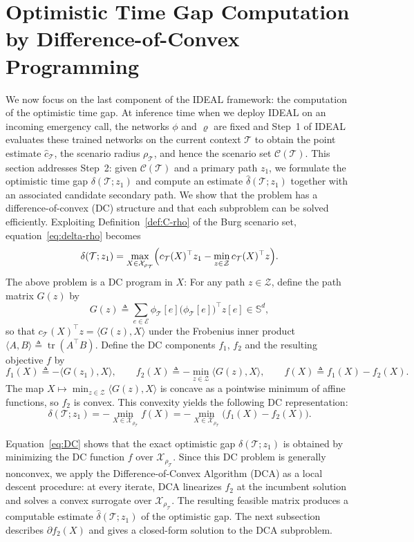 \documentclass[11pt, letterpaper, oneside, reqno]{amsart}
\DeclareMathOperator{\Tr}{tr}
\newcommand{\inner}[2]{\big \langle #1, #2 \big \rangle }
\newcommand{\Let}{\triangleq}
\begin{document}
\section{Optimistic Time Gap Computation by Difference-of-Convex Programming} \label{sec:solution-procedure}
We now focus on the last component of the IDEAL framework: the computation of the optimistic time gap. At inference time when we deploy IDEAL on an incoming emergency call, the networks $\phi$ and $\varrho$ are fixed and Step~1 of IDEAL evaluates these trained networks on the current context $\mathcal T$ to obtain the point estimate $\hat c_{\mathcal T}$, the scenario radius $\rho_{\mathcal T}$, and hence the scenario set $\mathcal C(\mathcal T)$. This section addresses Step~2: given $\mathcal C(\mathcal T)$ and a primary path $z_1$, we formulate the optimistic time gap $\delta(\mathcal T; z_1)$ and compute an estimate $\widehat{\delta}(\mathcal T; z_1)$ together with an associated candidate secondary path. We show that the problem has a difference-of-convex (DC) structure and that each subproblem can be solved efficiently. Exploiting Definition~\ref{def:C-rho} of the Burg scenario set, equation~\eqref{eq:delta-rho} becomes
\[
\delta(\mathcal T; z_1)
=
\max_{X \in \mathcal X_{\rho_{\mathcal T}}}
\Bigl(
c_{\mathcal T}(X)^\top z_1 - \min_{z \in \mathcal Z} c_{\mathcal T}(X)^\top z
\Bigr).
\]
The above problem is a DC program in $X$: For any path $z\in\mathcal Z$, define the path matrix $G(z)$ by
\begin{equation}
\label{eq:outer_product}
G(z) \Let \sum_{e\in\mathcal E} \phi_{\mathcal T}[e]\bigl(\phi_{\mathcal T}[e]\bigr)^\top z[e] \in \mathbb S^d,
\end{equation}
so that $c_{\mathcal T}(X)^\top z=\inner{G(z)}{X}$ under the Frobenius inner product $\inner{A}{B}\Let \Tr(A^\top B)$. Define the DC components $f_1$, $f_2$ and the resulting objective $f$ by
\[
f_1(X)\Let -\inner{G(z_1)}{X},
\qquad
f_2(X)\Let -\min_{z\in\mathcal Z}\inner{G(z)}{X},
\qquad
f(X)\Let f_1(X)-f_2(X).
\]
The map $X\mapsto\min_{z\in\mathcal Z}\inner{G(z)}{X}$ is concave as a pointwise minimum of affine functions, so $f_2$ is convex. This convexity yields the following DC representation:
\begin{equation}
\label{eq:DC}
\delta(\mathcal T; z_1)
= - \min_{X \in \mathcal X_{\rho_{\mathcal T}}} f(X)
= - \min_{X \in \mathcal X_{\rho_{\mathcal T}}} \bigl( f_1(X) - f_2(X) \bigr).
\end{equation}

Equation~\eqref{eq:DC} shows that the exact optimistic gap $\delta(\mathcal T; z_1)$ is obtained by minimizing the DC function $f$ over $\mathcal X_{\rho_{\mathcal T}}$. Since this DC problem is generally nonconvex, we apply the Difference-of-Convex Algorithm (DCA) as a local descent procedure: at every iterate, DCA linearizes $f_2$ at the incumbent solution and solves a convex surrogate over $\mathcal X_{\rho_{\mathcal T}}$. The resulting feasible matrix produces a computable estimate $\widehat{\delta}(\mathcal T;z_1)$ of the optimistic gap. The next subsection describes $\partial f_2(X)$ and gives a closed-form solution to the DCA subproblem.
\end{document}
